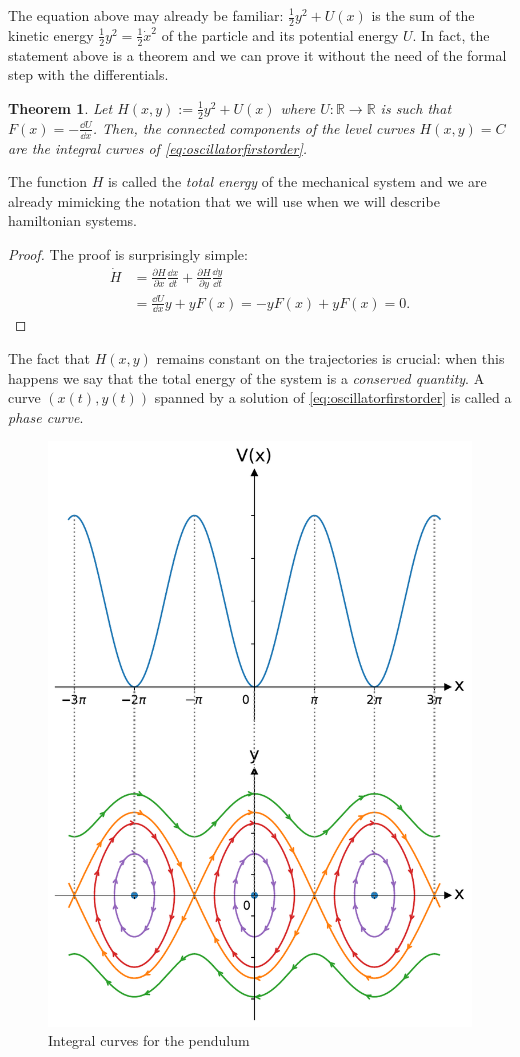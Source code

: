 \documentclass[english,fontsize=11pt,paper=b5]{scrbook}
\newtheorem{theorem}{Theorem}[chapter]
\theoremstyle{definition}
\begin{document}
    The equation above may already be familiar: $\frac12 y^2 + U(x)$ is the sum of the kinetic energy $\frac12 y^2 = \frac12 {\dot x}^2$ of the particle and its potential energy $U$. In fact, the statement above is a theorem and we can prove it without the need of the formal step with the differentials.

    \begin{theorem}\label{thm:ham1}
      Let $H(x, y) := \frac12 y^2 + U(x)$ where $U:\mathbb{R}\to\mathbb{R}$ is such that $F(x) = -\frac{\dd U}{\dd x}$.
      Then, the connected components of the level curves $H(x,y) = C$ are the integral curves of \eqref{eq:oscillatorfirstorder}.
    \end{theorem}
    The function $H$ is called the \emph{total energy} of the mechanical system and we are already mimicking the notation that we will use when we will describe hamiltonian systems.
    \begin{proof}
      The proof is surprisingly simple:
      \begin{align}
        \dot H & = \frac{\partial H}{\partial x}\frac{\dd x}{\dd t} + \frac{\partial H}{\partial y}\frac{\dd y}{\dd t} \\
               & = \frac{\dd U}{\dd x} y + y F(x)
               = -y F(x) + y F(x) = 0.
      \end{align}
    \end{proof}

    The fact that $H(x,y)$ remains constant on the trajectories is crucial: when this happens we say that the total energy of the system is a \emph{conserved quantity}.
    A curve $(x(t), y(t))$ spanned by a solution of \eqref{eq:oscillatorfirstorder} is called a \emph{phase curve}.

    \begin{figure}[htbp]
      \centering
      \includegraphics[width=.7\linewidth]{images/potential-curves-pendulum.pdf}
      \caption{Integral curves for the pendulum}
      \label{fig:pendulum}
    \end{figure}
\end{document}
